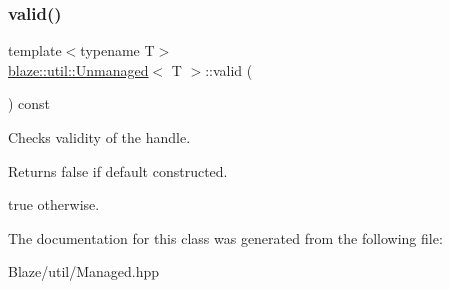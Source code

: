 \subsubsection{\texorpdfstring{valid()}{valid()}}
{\footnotesize\ttfamily template$<$typename T$>$ \\
\hyperlink{classblaze_1_1util_1_1Unmanaged}{blaze\+::util\+::\+Unmanaged}$<$ T $>$\+::valid (\begin{DoxyParamCaption}{ }\end{DoxyParamCaption}) const\hspace{0.3cm}{\ttfamily [inline]}}



Checks validity of the handle. 

\begin{DoxyReturn}{Returns}
false if default constructed. 

true otherwise. 
\end{DoxyReturn}


The documentation for this class was generated from the following file\+:\begin{DoxyCompactItemize}
\item 
Blaze/util/Managed.\+hpp\end{DoxyCompactItemize}

